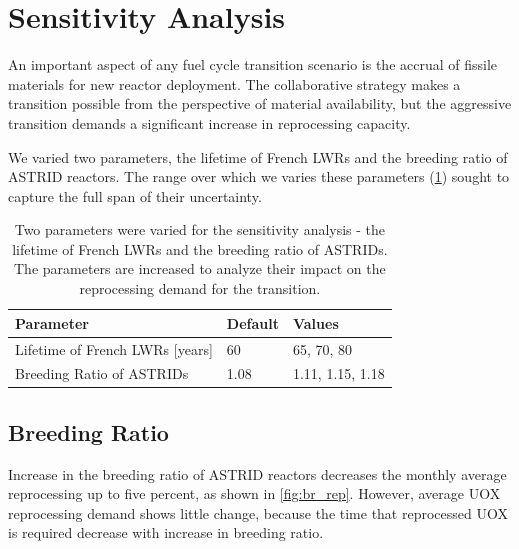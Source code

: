 \section{Sensitivity Analysis}

An important aspect of any fuel cycle transition scenario
is the accrual of fissile materials for new reactor deployment.
The collaborative strategy makes a transition possible 
from the perspective of material availability,
but the aggressive transition demands a significant increase in reprocessing capacity.

We varied two parameters, the lifetime of French \glspl{LWR} and the
breeding ratio of \gls{ASTRID} reactors. The range over which we varies these parameters (\cref{tab:sen_par})
sought to capture the full span of their uncertainty.

\begin{table}[h]
    \centering
    \begin{tabularx}{\textwidth}{lbb}
        \hline
        \textbf{Parameter} & \textbf{Default} & \textbf{Values} \\
        \hline
        Lifetime of French \glspl{LWR} [years] & 60  & 65, 70, 80 \\
        Breeding Ratio of \glspl{ASTRID} & 1.08 & 1.11, 1.15, 1.18 \\ 
        \hline
    \end{tabularx}
    \caption {Two parameters were varied for the sensitivity analysis - the 
              lifetime of French \glspl{LWR} and the breeding ratio of \glspl{ASTRID}.
              The parameters are increased to analyze their impact on the reprocessing
              demand for the transition.}
    \label{tab:sen_par}
\end{table}

\subsection{Breeding Ratio}

Increase in the breeding ratio of \gls{ASTRID} reactors
decreases the monthly average reprocessing up to five percent,
as shown in \cref{fig:br_rep}.
However, average \gls{UOX} reprocessing demand shows little change,
because the time that reprocessed \gls{UOX} is required decrease with
increase in breeding ratio. 


